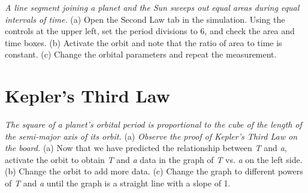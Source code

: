 \documentclass[12pt]{article}
\begin{document}
\textit{A line segment joining a planet and the Sun sweeps out equal areas during equal intervals of time.} (a) Open the Second Law tab in the simulation.  Using the controls at the upper left, set the period divisions to 6, and check the area and time boxes.  (b) Activate the orbit and note that the ratio of area to time is constant.  (c) Change the orbital parameters and repeat the measurement.

\section{Kepler's Third Law}

\textit{The square of a planet's orbital period is proportional to the cube of the length of the semi-major axis of its orbit.} (a) \textit{Observe the proof of Kepler's Third Law on the board.}  (a) Now that we have predicted the relationship between \textit{T} and \textit{a}, activate the orbit to obtain \textit{T} and \textit{a} data in the graph of \textit{T} vs. \textit{a} on the left side.  (b) Change the orbit to add more data.  (c) Change the graph to different powers of \textit{T} and \textit{a} until the graph is a straight line with a slope of 1.
\end{document}
